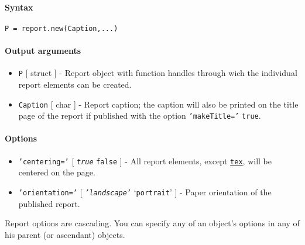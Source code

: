 


	\paragraph{Syntax}\label{syntax}

\begin{verbatim}
P = report.new(Caption,...)
\end{verbatim}

\paragraph{Output arguments}\label{output-arguments}

\begin{itemize}
\item
  \texttt{P} {[} struct {]} - Report object with function handles
  through wich the individual report elements can be created.
\item
  \texttt{Caption} {[} char {]} - Report caption; the caption will also
  be printed on the title page of the report if published with the
  option \texttt{'makeTitle='} \texttt{true}.
\end{itemize}

\paragraph{Options}\label{options}

\begin{itemize}
\item
  \texttt{'centering='} {[} \emph{\texttt{true}} \textbar{}
  \texttt{false} {]} - All report elements, except
  \href{report/tex}{\texttt{tex}}, will be centered on the page.
\item
  \texttt{'orientation='} {[} \emph{\texttt{'landscape'}} \textbar{}
  `\texttt{portrait}' {]} - Paper orientation of the published report.
\end{itemize}

Report options are cascading. You can specify any of an object's options
in any of his parent (or ascendant) objects.


